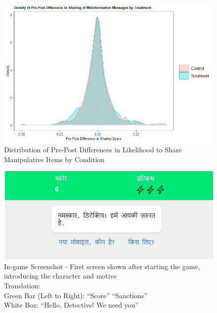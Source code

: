 \documentclass[empirical, authordate, issue]{jote-new-article}
\begin{document}
\begin{figure}[h]

  \includegraphics[width=\linewidth]{media/supplement/images3.jpeg}
  \caption{Distribution of Pre-Post Differences in Likelihood to Share Manipulative Items by Condition}
  \label{}


\end{figure}






\begin{figure}

  \includegraphics[width=\linewidth]{media/supplement/images4.jpeg}
  \caption{In-game Screenshot - First screen shown after starting the game, introducing the
    character and motive \\
    Translation: \\
    Green Bar (Left to Right): “Score” “Sanctions” \\
    White Box: “Hello, Detective! We need you”}
  \label{}


\end{figure}
\end{document}
